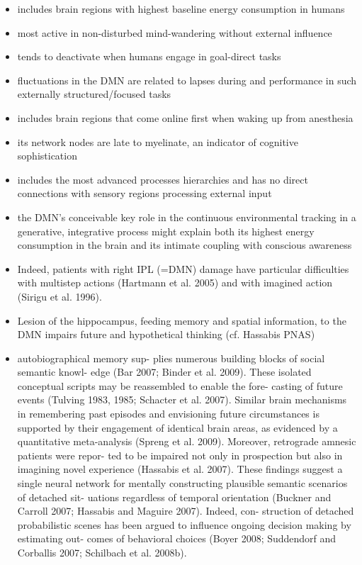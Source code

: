 \documentclass{article} %
\begin{document}
\begin{itemize}
  \item includes brain regions with highest baseline energy consumption in humans
  \item most active in non-disturbed mind-wandering without external influence
  \item tends to deactivate when humans engage in goal-direct tasks
  \item fluctuations in the DMN are related to lapses during and performance in
  such externally structured/focused tasks
  \item includes brain regions that come online first when waking up from
  anesthesia
  \item its network nodes are late to myelinate, an indicator of cognitive sophistication
  \item includes the most advanced processes hierarchies and has
  no direct connections with sensory regions processing external input
  \item the DMN's conceivable key role in the continuous environmental
  tracking in a generative, integrative process might explain both its highest energy consumption in the brain and its intimate coupling with conscious awareness
  \item Indeed, patients with right IPL (=DMN) damage have particular difficulties
  with multistep actions (Hartmann et al. 2005)
  and with imagined action (Sirigu et al. 1996).
  \item Lesion of the hippocampus, feeding memory and spatial information, to the
  DMN impairs future and hypothetical thinking (cf. Hassabis PNAS)

  \item
  autobiographical memory sup- plies numerous building blocks of social semantic knowl- edge (Bar 2007; Binder et al. 2009). These isolated conceptual scripts may be reassembled to enable the fore- casting of future events (Tulving 1983, 1985; Schacter et al. 2007). Similar brain mechanisms in remembering past episodes and envisioning future circumstances is supported by their engagement of identical brain areas, as evidenced by a quantitative meta-analysis (Spreng et al. 2009). Moreover, retrograde amnesic patients were repor- ted to be impaired not only in prospection but also in imagining novel experience (Hassabis et al. 2007). These findings suggest a single neural network for mentally constructing plausible semantic scenarios of detached sit- uations regardless of temporal orientation (Buckner and Carroll 2007; Hassabis and Maguire 2007). Indeed, con- struction of detached probabilistic scenes has been argued to influence ongoing decision making by estimating out- comes of behavioral choices (Boyer 2008; Suddendorf and Corballis 2007; Schilbach et al. 2008b). 
\end{itemize}
\end{document}
